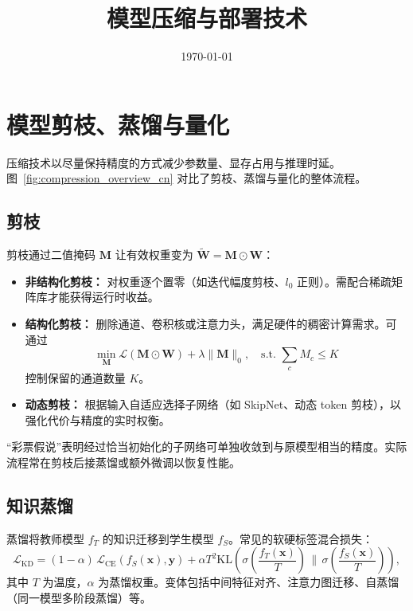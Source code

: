 \documentclass[UTF8,zihao=-4]{ctexart}
\title{模型压缩与部署技术}
\author{}
\date{\today}
\begin{document}
\maketitle
\tableofcontents
\FloatBarrier

\section{模型剪枝、蒸馏与量化}
压缩技术以尽量保持精度的方式减少参数量、显存占用与推理时延。图~\ref{fig:compression_overview_cn} 对比了剪枝、蒸馏与量化的整体流程。

\subsection{剪枝}
剪枝通过二值掩码 $\mathbf{M}$ 让有效权重变为 $\tilde{\mathbf{W}} = \mathbf{M} \odot \mathbf{W}$：
\begin{itemize}
  \item \textbf{非结构化剪枝：} 对权重逐个置零（如迭代幅度剪枝、$l_0$ 正则）。需配合稀疏矩阵库才能获得运行时收益。
  \item \textbf{结构化剪枝：} 删除通道、卷积核或注意力头，满足硬件的稠密计算需求。可通过
  \begin{equation}
    \min_{\mathbf{M}} \mathcal{L}(\mathbf{M} \odot \mathbf{W}) + \lambda \|\mathbf{M}\|_0, \quad \text{s.t. } \sum_{c} M_c \le K
  \end{equation}
  控制保留的通道数量 $K$。
  \item \textbf{动态剪枝：} 根据输入自适应选择子网络（如 SkipNet、动态 token 剪枝），以强化代价与精度的实时权衡。
\end{itemize}
“彩票假说”表明经过恰当初始化的子网络可单独收敛到与原模型相当的精度。实际流程常在剪枝后接蒸馏或额外微调以恢复性能。

\subsection{知识蒸馏}
蒸馏将教师模型 $f_T$ 的知识迁移到学生模型 $f_S$。常见的软硬标签混合损失：
\begin{equation}
  \mathcal{L}_{\mathrm{KD}} = (1-\alpha)\,\mathcal{L}_{\mathrm{CE}}(f_S(\mathbf{x}), \mathbf{y}) + \alpha T^2 \mathrm{KL}\left(\sigma\left(\frac{f_T(\mathbf{x})}{T}\right) \,\Big\|\, \sigma\left(\frac{f_S(\mathbf{x})}{T}\right)\right),
\end{equation}
其中 $T$ 为温度，$\alpha$ 为蒸馏权重。变体包括中间特征对齐、注意力图迁移、自蒸馏（同一模型多阶段蒸馏）等。
\end{document}
